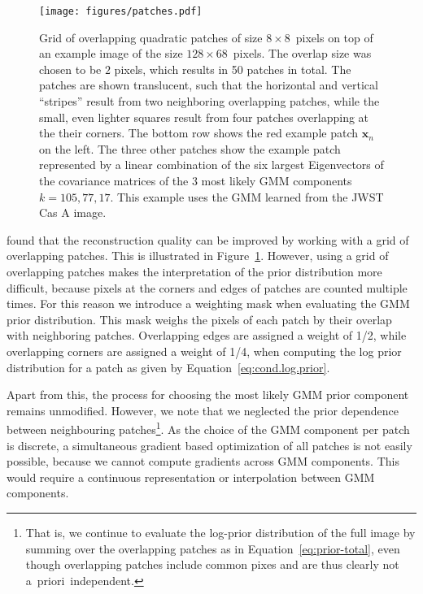 \documentclass[twocolumn]{aastex631}
\newcommand{\aprioir}{a~priori~}
\begin{document}
 \begin{figure}
        \begin{centering}
            \texttt{[image: figures/patches.pdf]}
            \caption{
                Grid of overlapping quadratic patches of size $8\times8$~pixels on top of an example image of the size $128 \times 68$~pixels. The overlap size was chosen to be $2$ pixels, which results in 50 patches in total. The patches are shown translucent, such that the horizontal and vertical \enquote{stripes} result from two neighboring overlapping patches, while the small, even lighter squares result from four patches overlapping at the their corners. The bottom row shows the red example patch $\mathbf{x}_n$ on the left. The three other patches show the example patch represented by a linear combination of the six largest Eigenvectors of the covariance matrices of the 3 most likely GMM components $k = 105, 77, 17$. This example uses the GMM learned from the JWST Cas A image.
            }
            \label{fig:patches}
        \end{centering}
    \end{figure}


    \cite{Zoran2011} found that the reconstruction quality can be improved by working with a grid of overlapping patches. This is illustrated in Figure~\ref{fig:patches}. However, using a grid of overlapping patches makes the interpretation of the prior distribution more difficult, because pixels at the corners and edges of patches are counted multiple times. For this reason we introduce a weighting mask when evaluating the GMM prior distribution. This mask weighs the pixels of each patch by their overlap with neighboring patches. Overlapping edges are assigned a weight of 1/2, while overlapping corners are assigned a weight of 1/4, when computing the log prior distribution for a patch as given by Equation~\ref{eq:cond.log.prior}.
    
    Apart from this, the process for choosing the most likely GMM prior component remains unmodified. However, we note that we neglected the prior dependence between neighbouring patches\footnote{That is, we continue to evaluate the log-prior distribution of the full image by summing over the overlapping patches as in Equation~\ref{eq:prior-total}, even though overlapping patches include common pixes and are thus clearly not \aprioir independent.}. As the choice of the GMM component per patch is discrete, a simultaneous gradient based optimization of all patches is not easily possible, because we cannot compute gradients across GMM components. This would require a continuous representation or interpolation between GMM components.
   
\end{document}
